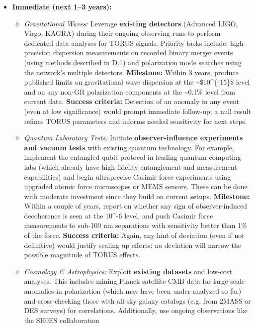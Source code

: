 \documentclass[]{article}
\begin{document}
{\begin{itemize}
\item
  \textbf{Immediate (next 1--3 years):}

  \begin{itemize}
  \item
    \emph{Gravitational Waves:} Leverage \textbf{existing detectors}
    (Advanced LIGO, Virgo, KAGRA) during their ongoing observing runs to
    perform dedicated data analyses for TORUS signals. Priority tasks
    include: high-precision dispersion measurements on recorded binary
    merger events (using methods described in D.1) and polarization mode
    searches using the network's multiple detectors. \textbf{Milestone:}
    Within 3 years, produce published limits on gravitational wave
    dispersion at the \textasciitilde{}\$10\^{}\{-15\}\$ level and on
    any non-GR polarization components at the \textasciitilde{}0.1\%
    level from current data. \textbf{Success criteria:} Detection of an
    anomaly in any event (even at low significance) would prompt
    immediate follow-up; a null result refines TORUS parameters and
    informs needed sensitivity for next steps.
  \item
    \emph{Quantum Laboratory Tests:} Initiate \textbf{observer-influence
    experiments and vacuum tests} with existing quantum technology. For
    example, implement the entangled qubit protocol in leading quantum
    computing labs (which already have high-fidelity entanglement and
    measurement capabilities) and begin ultraprecise Casimir force
    experiments using upgraded atomic force microscopes or MEMS sensors.
    These can be done with moderate investment since they build on
    current setups. \textbf{Milestone:} Within a couple of years, report
    on whether any sign of observer-induced decoherence is seen at the
    10\^{}-6 level, and push Casimir force measurements to sub-100 nm
    separations with sensitivity better than 1\% of the force.
    \textbf{Success criteria:} Again, any hint of deviation (even if not
    definitive) would justify scaling up efforts; no deviation will
    narrow the possible magnitude of TORUS effects.
  \item
    \emph{Cosmology \& Astrophysics:} Exploit \textbf{existing datasets}
    and low-cost analyses. This includes mining Planck satellite CMB
    data for large-scale anomalies in polarization (which may have been
    under-analyzed so far) and cross-checking those with all-sky galaxy
    catalogs (e.g. from 2MASS or DES surveys) for correlations.
    Additionally, use ongoing observations like the SH0ES collaboration

\end{itemize}
\end{itemize}}
\end{document}
